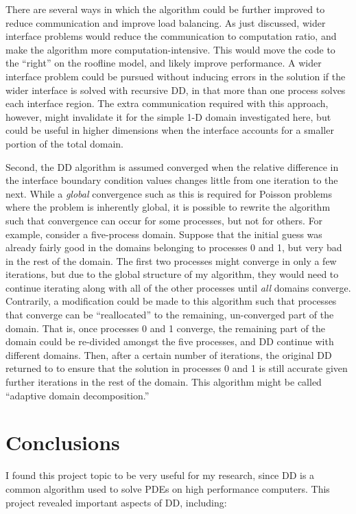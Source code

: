 \documentclass[10pt]{article}
\begin{document}
There are several ways in which the algorithm could be further improved to reduce communication and improve load balancing. As just discussed, wider interface problems would reduce the communication to computation ratio, and make the algorithm more computation-intensive. This would move the code to the ``right'' on the roofline model, and likely improve performance. A wider interface problem could be pursued without inducing errors in the solution if the wider interface is solved with recursive DD, in that more than one process solves each interface region. The extra communication required with this approach, however, might invalidate it for the simple 1-D domain investigated here, but could be useful in higher dimensions when the interface accounts for a smaller portion of the total domain.

Second, the DD algorithm is assumed converged when the relative difference in the interface boundary condition values changes little from one iteration to the next. While a {\it global} convergence such as this is required for Poisson problems where the problem is inherently global, it is possible to rewrite the algorithm such that convergence can occur for some processes, but not for others. For example, consider a five-process domain. Suppose that the initial guess was already fairly good in the domains belonging to processes 0 and 1, but very bad in the rest of the domain. The first two processes might converge in only a few iterations, but due to the global structure of my algorithm, they would need to continue iterating along with all of the other processes until {\it all} domains converge. Contrarily, a modification could be made to this algorithm such that processes that converge can be ``reallocated'' to the remaining, un-converged part of the domain. That is, once processes 0 and 1 converge, the remaining part of the domain could be re-divided amongst the five processes, and DD continue with different domains. Then, after a certain number of iterations, the original DD returned to to ensure that the solution in processes 0 and 1 is still accurate given further iterations in the rest of the domain. This algorithm might be called ``adaptive domain decomposition.'' 

\section{Conclusions}
I found this project topic to be very useful for my research, since DD is a common algorithm used to solve PDEs on high performance computers. This project revealed important aspects of DD, including:
\end{document}
